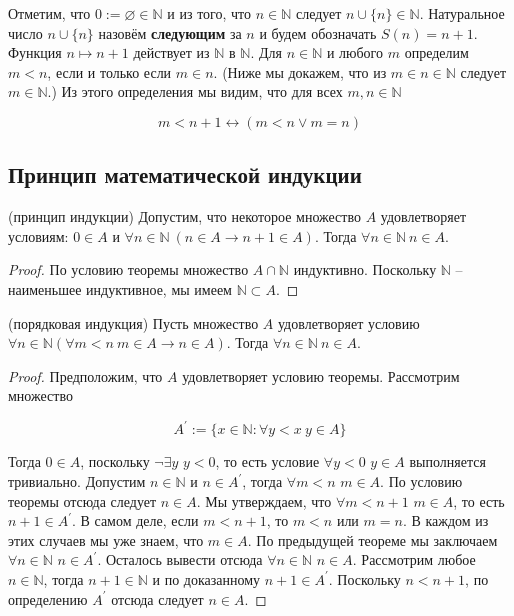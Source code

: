 Отметим, что $0 := \varnothing \in \mathbb{N}$ и из того, что $n \in \mathbb{N}$ следует $n \cup\{n\} \in
\mathbb{N}$. Натуральное число $n \cup\{n\}$ назовём \textbf{следующим} за $n$ и будем обозначать $S(n) = n + 1$.
Функция $n \mapsto n+1$ действует из $\mathbb{N}$ в $\mathbb{N}$. Для $n \in \mathbb{N}$ и любого $m$ определим $m
< n$, если и только если $m \in n$. (Ниже мы докажем, что из $m \in n \in \mathbb{N}$ следует $m \in \mathbb{N}$.)
Из этого определения мы видим, что для всех $m, n \in \mathbb{N}$ 

$$m<n+1 \leftrightarrow(m<n \vee m=n)$$

\subsection{Принцип математической индукции}

\begin{theorem}
	(принцип индукции) Допустим, что некоторое множество $A$ удовлетворяет условиям: $0 \in A$ и $\forall n \in
	\mathbb{N} \ (n \in A \rightarrow n+1 \in A)$. Тогда $\forall n \in \mathbb{N} \ n \in A$.
\end{theorem}

\begin{proof}{По условию теоремы множество $A \cap \mathbb{N}$ индуктивно. Поскольку $\mathbb{N}$ -- наименьшее
	индуктивное, мы имеем $\mathbb{N} \subset A$.}
\end{proof}

\begin{theorem}
	(порядковая индукция) Пусть множество $A$ удовлетворяет условию $\forall n \in \mathbb{N}(\forall m<n \ m \in A
	\rightarrow n \in A)$. Тогда $\forall n \in \mathbb{N} \ n \in A$.
\end{theorem}

\begin{proof}{Предположим, что $A$ удовлетворяет условию теоремы. Рассмотрим множество

	$$A^{\prime}:=\{x \in \mathbb{N}: \forall y<x \ y \in A\}$$

	Тогда $0 \in A$, поскольку $\neg \exists y$ $y<0$, то есть условие $\forall y<0$ $y \in A$ выполняется
	тривиально. Допустим $n \in \mathbb{N}$ и $n \in A^{\prime}$, тогда $\forall m<n$ $m \in A$. По условию теоремы
	отсюда следует $n \in A$. Мы утверждаем, что $\forall m < n + 1$ $m \in A$, то есть $n+1 \in A^\prime$. В самом
	деле, если $m < n + 1$, то $ m < n$ или $ m = n$. В каждом из этих случаев мы уже знаем, что $m \in A$. По
	предыдущей теореме мы заключаем $\forall n \in \mathbb{N}$ $n \in A^{\prime}$. Осталось вывести отсюда $\forall
	n \in \mathbb{N}$ $n \in A$. Рассмотрим любое $n \in \mathbb{N}$, тогда $n + 1 \in \mathbb{N}$ и по доказанному
	$n + 1 \in A^{\prime}$. Поскольку $n < n + 1$, по определению $A^\prime$ отсюда следует $n \in A$.}
\end{proof}

